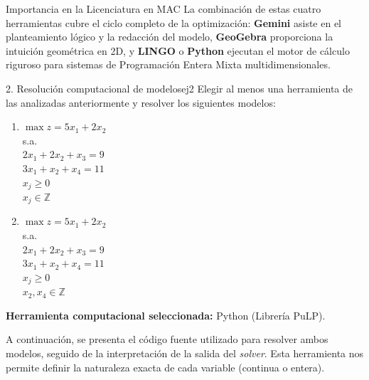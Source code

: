 \documentclass[10pt,a4paper]{article}
\begin{document}
\begin{nota}{Importancia en la Licenciatura en MAC}
La combinación de estas cuatro herramientas cubre el ciclo completo de la optimización: \textbf{Gemini} asiste en el planteamiento lógico y la redacción del modelo, \textbf{GeoGebra} proporciona la intuición geométrica en 2D, y \textbf{LINGO} o \textbf{Python} ejecutan el motor de cálculo riguroso para sistemas de Programación Entera Mixta multidimensionales.
\end{nota}

\newpage

\begin{ejercicio}{2. Resolución computacional de modelos}{ej2}
Elegir al menos una herramienta de las analizadas anteriormente y resolver los siguientes modelos:
\begin{enumerate}
    \item[a)] $\max z = 5x_1 + 2x_2$ \\
    s.a. \\
    $2x_1 + 2x_2 + x_3 = 9$ \\
    $3x_1 + x_2 + x_4 = 11$ \\
    $x_j \ge 0$ \\
    $x_j \in \mathbb{Z}$
    
    \item[b)] $\max z = 5x_1 + 2x_2$ \\
    s.a. \\
    $2x_1 + 2x_2 + x_3 = 9$ \\
    $3x_1 + x_2 + x_4 = 11$ \\
    $x_j \ge 0$ \\
    $x_2, x_4 \in \mathbb{Z}$
\end{enumerate}

\end{ejercicio}

\vspace{0.4cm}
\textbf{Herramienta computacional seleccionada:} Python (Librería PuLP).

A continuación, se presenta el código fuente utilizado para resolver ambos modelos, 
seguido de la interpretación de la salida del \textit{solver}. 
Esta herramienta nos permite definir la naturaleza exacta de cada variable 
(continua o entera).
\end{document}
